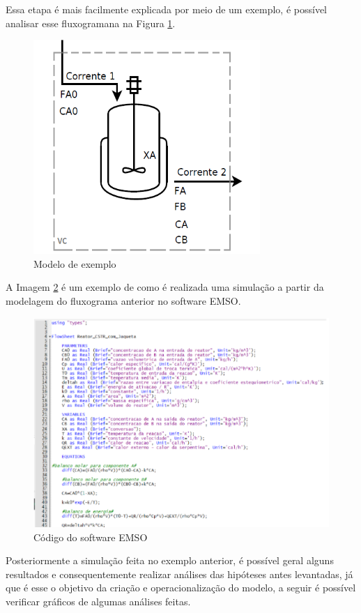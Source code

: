 \documentclass[
	12pt,				%
	openright,			%
	oneside,			%
	a4paper,			%
	english,			%
	french,				%
	spanish,			%
	brazil				%
	]{abntex2}
\begin{document}
Essa etapa é mais facilmente explicada por meio de um exemplo, é possível analisar esse fluxogramana na Figura \ref{Modelo de exemplo}.

\begin{figure}[H]
\centering
\includegraphics[scale=0.5]{exemplo.png} 
\caption{Modelo de exemplo}
\label{Modelo de exemplo}
\end{figure}

A Imagem \ref{Código EMSO} é um exemplo de como é realizada uma simulação a partir da modelagem do fluxograma anterior no software EMSO.

\begin{figure}[H]
\centering
\includegraphics[scale=0.4]{exemplocodigo.png} 
\caption{Código do software EMSO}
\label{Código EMSO}
\end{figure}

Posteriormente a simulação feita no exemplo anterior, é possível geral alguns resultados e consequentemente realizar análises das hipóteses antes levantadas, já que é esse o objetivo da criação e operacionalização do modelo, a seguir é possível verificar gráficos de algumas análises feitas.
\end{document}
